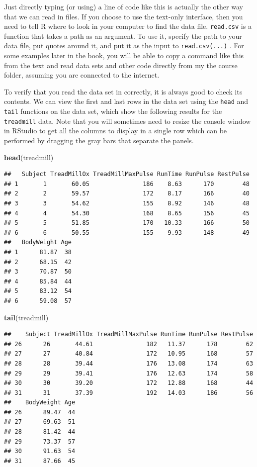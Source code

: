 \documentclass[]{book}
\newenvironment{Shaded}{\begin{snugshade}}{\end{snugshade}}
\newcommand{\KeywordTok}[1]{\textcolor[rgb]{0.13,0.29,0.53}{\textbf{#1}}}
\newcommand{\NormalTok}[1]{#1}
\begin{document}
Just directly typing (or using) a line of code like this is actually the
other way that we can read in files. If you choose to use the text-only
interface, then you need to tell R where to look in your computer to
find the data file. \texttt{read.csv} is a function that takes a path as
an argument. To use it, specify the path to your data file, put quotes
around it, and put it as the input to \texttt{read.csv(...)} . For some
examples later in the book, you will be able to copy a command like this
from the text and read data sets and other code directly from my the
course folder, assuming you are connected to the internet.

To verify that you read the data set in correctly, it is always good to
check its contents. We can view the first and last rows in the data set
using the \texttt{head} and \texttt{tail} functions on the data set,
which show the following results for the \texttt{treadmill} data. Note
that you will sometimes need to resize the console window in RStudio to
get all the columns to display in a single row which can be performed by
dragging the gray bars that separate the panels.

\begin{Shaded}
\begin{Highlighting}[]
\KeywordTok{head}\NormalTok{(treadmill)}
\end{Highlighting}
\end{Shaded}

\begin{verbatim}
##   Subject TreadMillOx TreadMillMaxPulse RunTime RunPulse RestPulse
## 1       1       60.05               186    8.63      170        48
## 2       2       59.57               172    8.17      166        40
## 3       3       54.62               155    8.92      146        48
## 4       4       54.30               168    8.65      156        45
## 5       5       51.85               170   10.33      166        50
## 6       6       50.55               155    9.93      148        49
##   BodyWeight Age
## 1      81.87  38
## 2      68.15  42
## 3      70.87  50
## 4      85.84  44
## 5      83.12  54
## 6      59.08  57
\end{verbatim}

\begin{Shaded}
\begin{Highlighting}[]
\KeywordTok{tail}\NormalTok{(treadmill)}
\end{Highlighting}
\end{Shaded}

\begin{verbatim}
##    Subject TreadMillOx TreadMillMaxPulse RunTime RunPulse RestPulse
## 26      26       44.61               182   11.37      178        62
## 27      27       40.84               172   10.95      168        57
## 28      28       39.44               176   13.08      174        63
## 29      29       39.41               176   12.63      174        58
## 30      30       39.20               172   12.88      168        44
## 31      31       37.39               192   14.03      186        56
##    BodyWeight Age
## 26      89.47  44
## 27      69.63  51
## 28      81.42  44
## 29      73.37  57
## 30      91.63  54
## 31      87.66  45
\end{verbatim}
\end{document}
